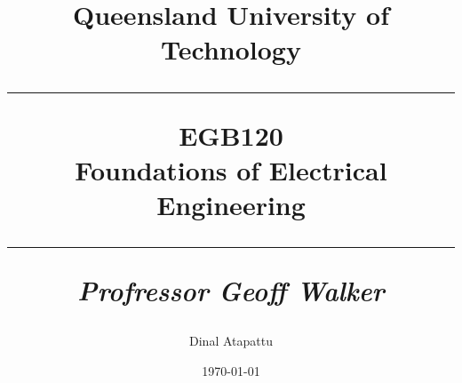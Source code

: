 \documentclass[oneside]{book}
\begin{document}
\pagestyle{fancy}
    \fancyhf{}
\fancyhead[R]{\nouppercase{\leftmark}}
\renewcommand{\footrulewidth}{0.4pt}
    \title{
            Queensland University of Technology\\
            \rule{\linewidth}{0.5pt}
        \centering
        \textbf{EGB120} \\
        Foundations of Electrical Engineering\\
        \vspace{0.4cm}
        \rule{\linewidth}{1.5pt}
        \small{\textit{Profressor Geoff Walker}}
    }
    \author{Dinal Atapattu}
    \date{\today}
    \maketitle
    \thispagestyle{empty}
    \tableofcontents
        
        
        
        
        
        
        
        
        
        
        
        
        
\end{document}
